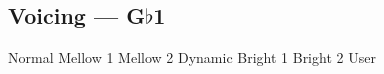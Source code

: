 \subsection[Voicing]{Voicing --- \UiKey{\I}\UiKey{\SET}G$\flat$1}









































Normal
Mellow 1
Mellow 2
Dynamic
Bright 1
Bright 2
User
